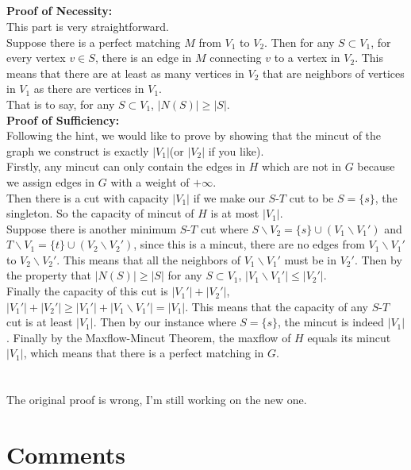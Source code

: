 \documentclass[12pt,letterpaper]{article}
\begin{document}
\subsection{}
\textbf{Proof of Necessity:}\\
This part is very straightforward.\\
Suppose there is a perfect matching $M$ from $V_1$ to $V_2$.
Then for any $S\subset V_1$, 
for every vertex $v\in S$,
there is an edge in $M$ connecting $v$ to a vertex in $V_2$.
This means that there are at least as many vertices in $V_2$ that are neighbors of vertices in $V_1$
as there are vertices in $V_1$.\\
That is to say, for any $S\subset V_1$,
$|N(S)|\geq|S|$.\\
\textbf{Proof of Sufficiency:}\\
Following the hint, we would like to prove by showing that the mincut 
of the graph we construct is exactly $|V_1|$(or $|V_2|$ if you like).\\
Firstly, any mincut can only contain the edges in $H$ which are not in $G$
because we assign edges in $G$ with a weight of $+\infty$.\\
Then there is a cut with capacity $|V_1|$ 
if we make our $S$-$T$ cut to be $S=\{s\}$, the singleton.
So the capacity of mincut of $H$ is at most $|V_1|$.\\
Suppose there is another minimum $S$-$T$ cut where $S\backslash V_2=\{s\}\cup (V_1\backslash V_1')$
and $T\backslash V_1=\{t\}\cup (V_2\backslash V_2')$,
since this is a mincut, 
there are no edges from $V_1\backslash V_1'$ to $V_2\backslash V_2'$.
This means that all the neighbors of $V_1\backslash V_1'$ must be in $V_2'$.
Then by the property that $|N(S)|\geq |S|$ for any $S\subset V_1$,
$|V_1\backslash V_1'|\leq |V_2'|$.\\
Finally the capacity of this cut is $|V_1'|+|V_2'|$,
$|V_1'|+|V_2'|\geq |V_1'|+|V_1\backslash V_1'|=|V_1|$.
This means that the capacity of any $S$-$T$ cut is at least $|V_1|$.
Then by our instance where $S=\{s\}$, the mincut is indeed $|V_1|$.
Finally by the Maxflow-Mincut Theorem, 
the maxflow of $H$ equals its mincut $|V_1|$,
which means that there is a perfect matching in $G$.
 
\newpage
\section{}
The original proof is wrong, 
I'm still working on the new one.


\newpage
\section{Comments}
\end{document}
